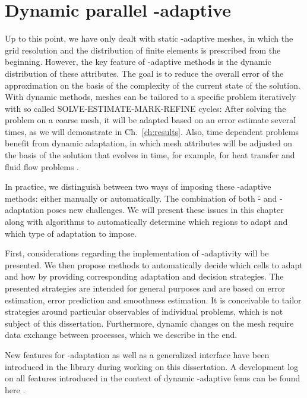 \chapter{Dynamic parallel \hp-adaptive }
\label{ch:dynamic}
\glsresetall

Up to this point, we have only dealt with static \hp-adaptive meshes, in which the grid resolution and the distribution of finite elements is prescribed from the beginning. %
However, the key feature of \hp-adaptive methods is the dynamic distribution of these attributes. The goal is to reduce the overall error of the approximation on the basis of the complexity of the current state of the solution. With dynamic methods, meshes can be tailored to a specific problem iteratively with so called SOLVE-ESTIMATE-MARK-REFINE cycles: After solving the problem on a coarse mesh, it will be adapted based on an error estimate several times, as we will demonstrate in Ch.~\ref{ch:results}. Also, time dependent problems benefit from dynamic adaptation, in which mesh attributes will be adjusted on the basis of the solution that evolves in time, for example, for heat transfer \textcite{dealiistep-26} and fluid flow problems \textcite{dealiistep-31}.

In practice, we distinguish between two ways of imposing these \hp-adaptive methods: either manually or automatically. The combination of both \h- and \p-adaptation poses new challenges. We will present these issues in this chapter along with algorithms to automatically determine which regions to adapt and which type of adaptation to impose.

First, considerations regarding the implementation of \hp-adaptivity will be presented. We then propose methods to automatically decide which cells to adapt and how by providing corresponding adaptation and decision strategies. The presented strategies are intended for general purposes and are based on error estimation, error prediction and smoothness estimation. It is conceivable to tailor strategies around particular observables of individual problems, which is not subject of this dissertation. Furthermore, dynamic changes on the mesh require data exchange between processes, which we describe in the end.

New features for \hp-adaptation as well as a generalized interface have been introduced in the \dealii{} library \textcite{dealii920} during working on this dissertation. A development log on all features introduced in the context of dynamic \hp-adaptive \glspl{fem} can be found here \cite{dealiiissue7515}.





